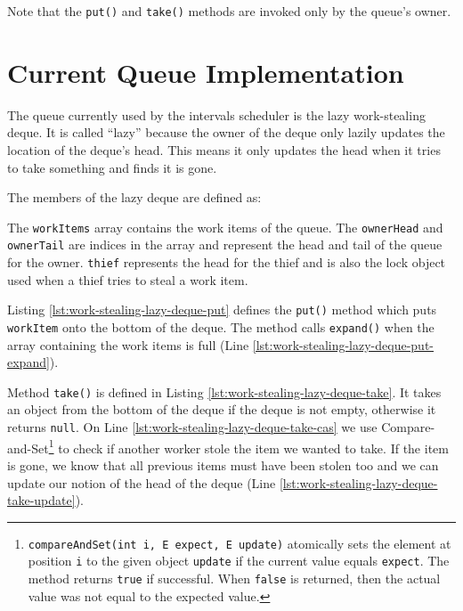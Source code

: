 

Note that the \lstinline!put()! and \lstinline!take()! methods are
invoked only by the queue's owner.


\section{Current Queue Implementation}
\label{sec:queues-background-current-implementation}

The queue currently used by the intervals scheduler is the lazy
work-stealing deque. It is called ``lazy'' because the owner of the
deque only lazily updates the location of the deque's head. This means
it only updates the head when it tries to take something and finds it
is gone.

The members of the lazy deque are defined as:



The \lstinline!workItems! array contains the work items of the
queue. The \lstinline!ownerHead! and \lstinline!ownerTail! are indices
in the array and represent the head and tail of the queue for the
owner. \lstinline!thief! represents the head for the thief and is also
the lock object used when a thief tries to steal a work item.

Listing \ref{lst:work-stealing-lazy-deque-put} defines the
\lstinline!put()! method which puts \lstinline!workItem! onto the
bottom of the deque. The method calls \lstinline!expand()! when the
array containing the work items is full (Line
\ref{lst:work-stealing-lazy-deque-put-expand}).



\VerbatimFootnotes Method \lstinline!take()! is defined in Listing
\ref{lst:work-stealing-lazy-deque-take}. It takes an object from the
bottom of the deque if the deque is not empty, otherwise it returns
\lstinline!null!. On Line \ref{lst:work-stealing-lazy-deque-take-cas}
we use
Compare-and-Set\footnote{\verb!compareAndSet(int i, E expect, E update)!
  atomically sets the element at position \verb!i! to the given object
  \verb!update! if the current value equals \verb!expect!. The method
  returns \verb!true! if successful. When \verb!false! is returned,
  then the actual value was not equal to the expected value.} to check
if another worker stole the item we wanted to take. If the item is
gone, we know that all previous items must have been stolen too and we
can update our notion of the head of the deque (Line
\ref{lst:work-stealing-lazy-deque-take-update}).

